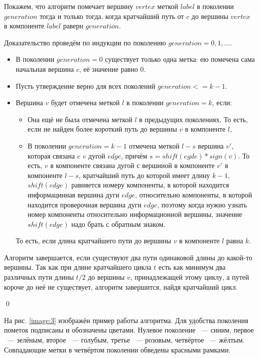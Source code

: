\documentclass[14pt]{mmcs-article}
\begin{document}
Покажем, что алгоритм помечает вершину $vertex$ меткой $label$ в поколении $generation$ тогда и только тогда, когда кратчайший путь от $c$ до вершины $vertex$ в компоненте $label$ раверн $generation$.

Доказательство проведём по индукции по  поколению $generation = 0, 1, ...$. 

\begin{itemize}
  \item В поколении $generation = 0$ существует только одна метка: ею помечена сама начальная вершина $c$, её значение равно $0$. 
  \item Пусть утверждение верно для всех поколений $generation <= k - 1$.
  \item Вершина $v$ будет отмечена меткой $l$ в поколении $generation = k$, если:
  \begin{itemize} 
    \item Она ещё не была отмечена меткой $l$ в предыдущих поколениях. То есть, если не найден более короткий путь до вершины $v$ в компоненте $l$, 
    \item В поколении $generation = k - 1$ отмечена меткой $l - s$ вершина $v'$, которая связана c $v$ дугой $edge$, причём $s = shift(egde) * sign(v)$. То есть, $v$ в компоненте связана дугой с вершиной в компоненте $v'$ в компоненте $l - s$, кратчайший путь до которой имеет длину $k - 1$, $shift(edge)$ равняется номеру компоненты, в которой находится информацинная вершина дуги $edge$, относительно компоненты, в которой находится проверочная вершина дуги $edge$, поэтому когда нужно узнать номер компоненты относительно информационной вершины, значение $shift(edge)$ надо брать с обратным знаком.
  \end{itemize}
  То есть, если длина кратчайшего пути до вершины $v$ в компоненте $l$ равна $k$.
\end{itemize}

Алгоритм завершается, если существуют два пути одинаковой длины до какой-то вершины. Так как при длине кратчайшего цикла $t$ есть как минимум два различных пути длины $t /2$ до вершины $v$, принадлежащей этому циклу, а путей короче до неё не существует, алгоритм завершится, найдя кратчайший цикл.

\qed

На рис. \ref{image:3} изображён пример работы алгоритма. Для удобства поколения пометок подписаны и обозначены цветами. Нулевое поколение ~--- синим, первое ~--- зелёным, второе ~--- голубым, третье ~--- розовым, четвёртое ~--- жёлтым. Совпадающие метки в четвёртом поколении обведены красными рамками. 
\end{document}
